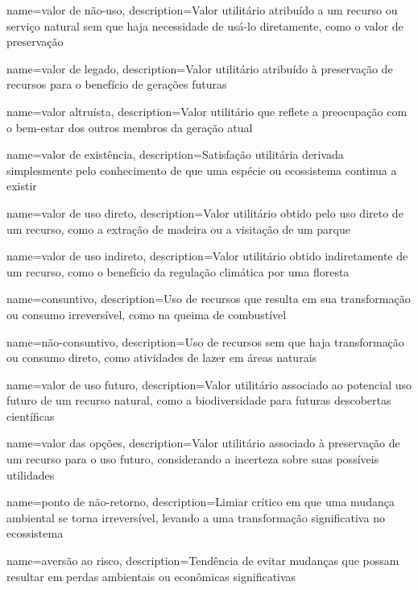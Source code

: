 {
	name=valor de não-uso,
	description={Valor utilitário atribuído a um recurso ou serviço natural sem que haja necessidade de usá-lo diretamente, como o valor de preservação}
}

{
	name=valor de legado,
	description={Valor utilitário atribuído à preservação de recursos para o benefício de gerações futuras}
}

{
	name=valor altruísta,
	description={Valor utilitário que reflete a preocupação com o bem-estar dos outros membros da geração atual}
}

{
	name=valor de existência,
	description={Satisfação utilitária derivada simplesmente pelo conhecimento de que uma espécie ou ecossistema continua a existir}
}

{
	name=valor de uso direto,
	description={Valor utilitário obtido pelo uso direto de um recurso, como a extração de madeira ou a visitação de um parque}
}

{
	name=valor de uso indireto,
	description={Valor utilitário obtido indiretamente de um recurso, como o benefício da regulação climática por uma floresta}
}

{
	name=consuntivo,
	description={Uso de recursos que resulta em sua transformação ou consumo irreversível, como na queima de combustível}
}

{
	name=não-consuntivo,
	description={Uso de recursos sem que haja transformação ou consumo direto, como atividades de lazer em áreas naturais}
}

{
	name=valor de uso futuro,
	description={Valor utilitário associado ao potencial uso futuro de um recurso natural, como a biodiversidade para futuras descobertas científicas}
}

{
	name=valor das opções,
	description={Valor utilitário associado à preservação de um recurso para o uso futuro, considerando a incerteza sobre suas possíveis utilidades}
}

{
	name=ponto de não-retorno,
	description={Limiar crítico em que uma mudança ambiental se torna irreversível, levando a uma transformação significativa no ecossistema}
}

{
	name=aversão ao risco,
	description={Tendência de evitar mudanças que possam resultar em perdas ambientais ou econômicas significativas}
}

